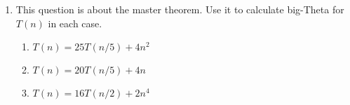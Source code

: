 \documentclass[11pt,a4paper]{scrartcl}
\newif\ifanswers
\begin{document}
\begin{enumerate}
\item This question is about the master theorem. Use it to
  calculate big-Theta for $T(n)$ in each case. 

\begin{enumerate}
\item $T(n)= 25T(n/5)+4n^2$
\item $T(n)= 20T(n/5)+4n$
\item $T(n)= 16T(n/2)+2n^4$
\end{enumerate}

\ifanswers

\noindent Solutions: for the first one $\log_5{25}=2$ and $c=2$ so
this is the middle case and $T(n)\in \Theta(n^2\log n)$, for the
second $\log_5 20>1$ so it is the first case and $T(n)\in
\Theta(n^{\log_5{20}})$; the last one is in the middle case as well
since $\log_2{16}=4$ and $T(n)\in \Theta(n^4\log{n})$.

\fi

\end{enumerate}
\end{document}
